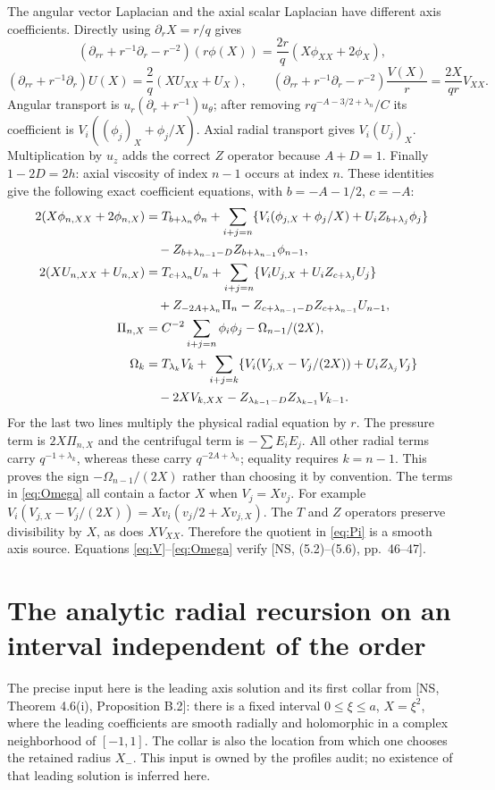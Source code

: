 \documentclass[10pt,a4paper]{article}
\begin{document}
The angular vector Laplacian and the axial scalar Laplacian have different
axis coefficients. Directly using $\partial_rX=r/q$ gives
\[
(\partial_{rr}+r^{-1}\partial_r-r^{-2})(r\phi(X))
 =\frac{2r}{q}(X\phi_{XX}+2\phi_X),
\]
\[
(\partial_{rr}+r^{-1}\partial_r)U(X)
 =\frac2q(XU_{XX}+U_X),\qquad
(\partial_{rr}+r^{-1}\partial_r-r^{-2})\frac{V(X)}r
 =\frac{2X}{qr}V_{XX}.
\]
Angular transport is $u_r(\partial_r+r^{-1})u_\theta$; after removing
$rq^{-A-3/2+\lambda_n}/C$ its coefficient is
$V_i((\phi_j)_X+\phi_j/X)$. Axial radial transport gives $V_i(U_j)_X$.
Multiplication by $u_z$ adds the correct $Z$ operator because $A+D=1$.
Finally $1-2D=2h$: axial viscosity of index $n-1$ occurs at index $n$.
These identities give the following exact coefficient equations, with
$b=-A-1/2$, $c=-A$:
\begin{align}
2(X\phi_{n,XX}+2\phi_{n,X})
 &=T_{b+\lambda_n}\phi_n+
 \sum_{i+j=n}\{V_i(\phi_{j,X}+\phi_j/X)+U_iZ_{b+\lambda_j}\phi_j\}\notag\\
 &\quad-Z_{b+\lambda_{n-1}-D}Z_{b+\lambda_{n-1}}\phi_{n-1},\label{eq:phi}\\
2(XU_{n,XX}+U_{n,X})
 &=T_{c+\lambda_n}U_n+
 \sum_{i+j=n}\{V_iU_{j,X}+U_iZ_{c+\lambda_j}U_j\}\notag\\
 &\quad+Z_{-2A+\lambda_n}\Pi_n
 -Z_{c+\lambda_{n-1}-D}Z_{c+\lambda_{n-1}}U_{n-1},\label{eq:U}\\
\Pi_{n,X}&=C^{-2}\sum_{i+j=n}\phi_i\phi_j-\Omega_{n-1}/(2X),\label{eq:Pi}\\
\Omega_k&=T_{\lambda_k}V_k+
 \sum_{i+j=k}\{V_i(V_{j,X}-V_j/(2X))+U_iZ_{\lambda_j}V_j\}\notag\\
 &\quad-2XV_{k,XX}-Z_{\lambda_{k-1}-D}Z_{\lambda_{k-1}}V_{k-1}.
\label{eq:Omega}
\end{align}
For the last two lines multiply the physical radial equation by $r$.
The pressure term is $2X\Pi_{n,X}$ and the centrifugal term is
$-\sum E_iE_j$. All other radial terms carry $q^{-1+\lambda_k}$,
whereas these carry $q^{-2A+\lambda_n}$; equality requires $k=n-1$.
This proves the sign $-\Omega_{n-1}/(2X)$ rather than choosing it by convention.
The terms in \eqref{eq:Omega} all contain a factor $X$ when $V_j=Xv_j$.
For example $V_i(V_{j,X}-V_j/(2X))=Xv_i(v_j/2+Xv_{j,X})$.
The $T$ and $Z$ operators preserve divisibility by $X$, as does $XV_{XX}$.
Therefore the quotient in \eqref{eq:Pi} is a smooth axis source.
Equations \eqref{eq:V}--\eqref{eq:Omega} verify [NS, (5.2)--(5.6), pp.~46--47].

\section{The analytic radial recursion on an interval independent of the order}
The precise input here is the leading axis solution and its first collar from
[NS, Theorem 4.6(i), Proposition B.2]: there is a fixed interval
$0\le\xi\le a$, $X=\xi^2$, where the leading coefficients are smooth radially
and holomorphic in a complex neighborhood of $[-1,1]$. The collar is also the
location from which one chooses the retained radius $X_-$. This input is owned
by the profiles audit; no existence of that leading solution is inferred here.
\end{document}

